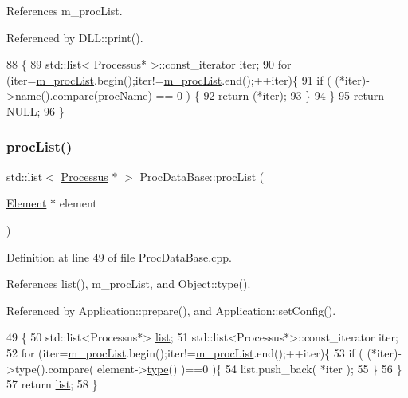 References m\+\_\+proc\+List.



Referenced by D\+L\+L\+::print().


\begin{DoxyCode}
88                                                         \{
89   std::list< Processus* >::const\_iterator iter;
90   \textcolor{keywordflow}{for} (iter=\hyperlink{classProcDataBase_a9b7458b811b826c5d264b436c7a391c4}{m\_procList}.begin();iter!=\hyperlink{classProcDataBase_a9b7458b811b826c5d264b436c7a391c4}{m\_procList}.end();++iter)\{
91     \textcolor{keywordflow}{if} ( (*iter)->name().compare(procName) == 0 ) \{
92       \textcolor{keywordflow}{return} (*iter);
93     \}        
94   \}
95   \textcolor{keywordflow}{return} NULL;
96 \}
\end{DoxyCode}
\mbox{\label{classProcDataBase_a8145de34e9857f3f6eebd2572740f198}} 
\subsubsection{\texorpdfstring{proc\+List()}{procList()}}
{\footnotesize\ttfamily std\+::list$<$ \hyperlink{classProcessus}{Processus} $\ast$ $>$ Proc\+Data\+Base\+::proc\+List (\begin{DoxyParamCaption}\item[{\hyperlink{classElement}{Element} $\ast$}]{element }\end{DoxyParamCaption})}



Definition at line 49 of file Proc\+Data\+Base.\+cpp.



References list(), m\+\_\+proc\+List, and Object\+::type().



Referenced by Application\+::prepare(), and Application\+::set\+Config().


\begin{DoxyCode}
49                                                               \{
50   std::list<Processus*> \hyperlink{classProcDataBase_a813dbc8f9e7c4d69074a01394f04fc98}{list};
51   std::list<Processus*>::const\_iterator iter;
52   \textcolor{keywordflow}{for} (iter=\hyperlink{classProcDataBase_a9b7458b811b826c5d264b436c7a391c4}{m\_procList}.begin();iter!=\hyperlink{classProcDataBase_a9b7458b811b826c5d264b436c7a391c4}{m\_procList}.end();++iter)\{
53     \textcolor{keywordflow}{if} ( (*iter)->type().compare( element->\hyperlink{classObject_a84f99f70f144a83e1582d1d0f84e4e62}{type}() )==0 )\{
54       list.push\_back( *iter );        
55     \}
56   \}
57   \textcolor{keywordflow}{return} \hyperlink{classProcDataBase_a813dbc8f9e7c4d69074a01394f04fc98}{list};
58 \}
\end{DoxyCode}
\mbox{\label{classProcDataBase_a0413976bac8f233b31eab6d7a83866b9}} 
